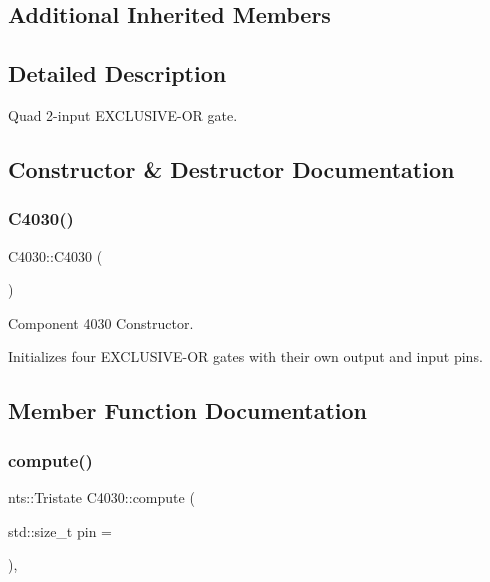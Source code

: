 \subsection*{Additional Inherited Members}


\subsection{Detailed Description}
Quad 2-\/input E\+X\+C\+L\+U\+S\+I\+V\+E-\/\+OR gate. 

\subsection{Constructor \& Destructor Documentation}
\mbox{\label{classC4030_a4451260ff546d7daeefe6ea4ee2e877a}} 
\subsubsection{\texorpdfstring{C4030()}{C4030()}}
{\footnotesize\ttfamily C4030\+::\+C4030 (\begin{DoxyParamCaption}{ }\end{DoxyParamCaption})}



Component 4030 Constructor. 

Initializes four E\+X\+C\+L\+U\+S\+I\+V\+E-\/\+OR gates with their own output and input pins. 

\subsection{Member Function Documentation}
\mbox{\label{classC4030_aa07ec80804c8109854c59da91c7ec636}} 
\subsubsection{\texorpdfstring{compute()}{compute()}}
{\footnotesize\ttfamily nts\+::\+Tristate C4030\+::compute (\begin{DoxyParamCaption}\item[{std\+::size\+\_\+t}]{pin = {} }\end{DoxyParamCaption})\hspace{0.3cm}{\ttfamily [override]}, {\ttfamily [virtual]}}



